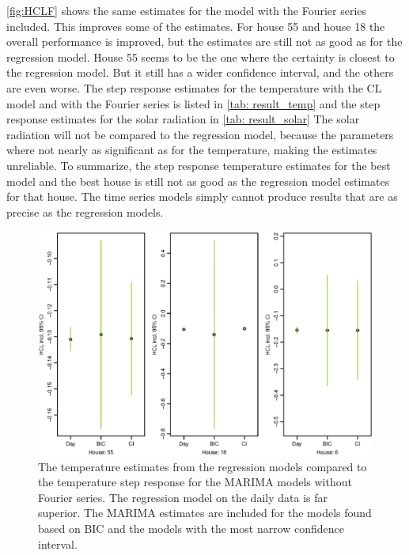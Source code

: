 \noindent \cref{fig:HCLF} shows the same estimates for the model with the Fourier series included. This improves some of the estimates. For house 55 and house 18 the overall performance is improved, but the estimates are still not as good as for the regression model. House 55 seems to be the one where the certainty is closest to the regression model. But it still has a wider confidence interval, and the others are even worse. The step response estimates for the temperature with the CL model and with the Fourier series is listed in \cref{tab: result_temp} and the step response estimates for the solar radiation in \cref{tab: result_solar}  The solar radiation will not be compared to the regression model, because the parameters where not nearly as significant as for the temperature, making the estimates unreliable. To summarize, the step response temperature estimates for the best model and the best house is still not as good as the regression model estimates for that house. The time series models simply cannot produce results that are as precise as the regression models.
\begin{figure}[ht]
    \centering
    \includegraphics[scale=0.6]{../../../figures/MarimaHCL.eps}
    \caption{The temperature estimates from the regression models compared to the temperature step response for the MARIMA models without Fourier series. The regression model on the daily data is far superior. The MARIMA estimates are included for the models found based on BIC and the models with the most narrow confidence interval.}
    \label{fig:HCL}
\end{figure}

